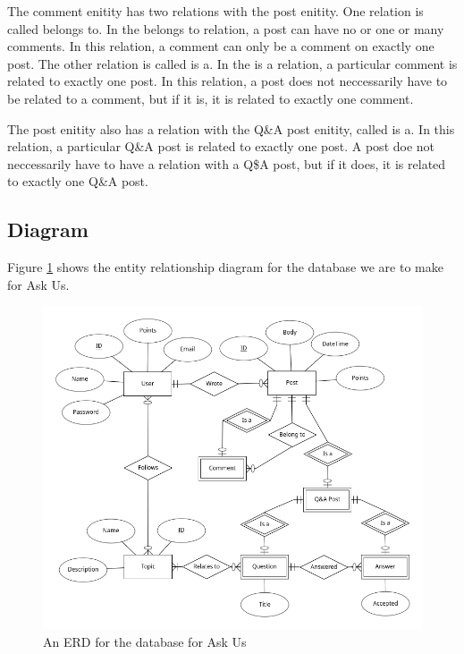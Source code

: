 The comment enitity has two relations with the post enitity. One relation is called belongs to. In the belongs to relation, a post can have no or one or many comments. In this relation, a comment can only be a comment on exactly one post. The other relation is called is a. In the is a relation, a particular comment is related to exactly one post. In this relation, a post does not neccessarily have to be related to a comment, but if it is, it is related to exactly one comment.

The post enitity also has a relation with the Q\&A post enitity, called is a. In this relation, a particular Q\&A post  is related to exactly one post. A post doe not neccessarily have to have a relation with a Q\$A post, but if it does, it is related to exactly one Q\&A post.



\subsection{Diagram}

Figure \ref{erd} shows the entity relationship diagram for the database we are to make for Ask Us.

\begin{figure}[htb]
	\centering
	\includegraphics[width=\linewidth]{../ERD/erd.png}
	\caption{An ERD for the database for Ask Us}
	\label{erd}
\end{figure}
